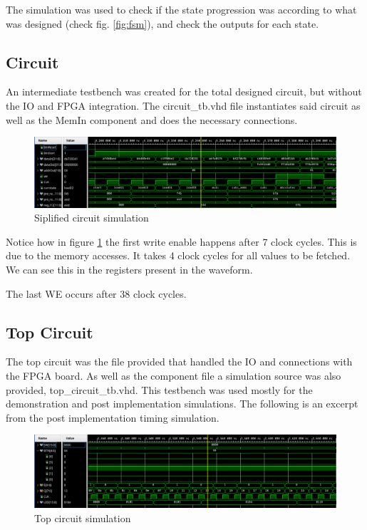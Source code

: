 \documentclass[12pt]{article}
\begin{document}
The simulation was used to check if the state progression was according to what was designed (check fig. \ref{fig:fsm}), and check the outputs for each state.

\subsection{Circuit}
An intermediate testbench was created for the total designed circuit, but without the IO and FPGA integration.
The circuit\_tb.vhd file instantiates said circuit as well as the MemIn component and does the necessary connections.

\begin{figure}[!htp]
	\centering
	\includegraphics[width=0.7\linewidth]{images/simCircuit.png}
	\caption{Siplified circuit simulation}
	\label{fig:simCircuit}
\end{figure}

Notice how in figure \ref{fig:simCircuit} the first write enable happens after 7 clock cycles. This is due to the memory accesses. It takes 4 clock cycles for all values to be fetched. We can see this in the registers present in the waveform.

The last WE occurs after 38 clock cycles.

\subsection{Top Circuit}
The top circuit was the file provided that handled the IO and connections with the FPGA board. As well as the component file a simulation source was also provided, top\_circuit\_tb.vhd. 
This testbench was used mostly for the demonstration and post implementation simulations. The following is an excerpt from the post implementation timing simulation.


\begin{figure}[!htp]
	\centering
	\includegraphics[width=0.7\linewidth]{images/simTopCircuit.png}
	\caption{Top circuit simulation}
	\label{fig:simTopCircuit}
\end{figure}
\end{document}
